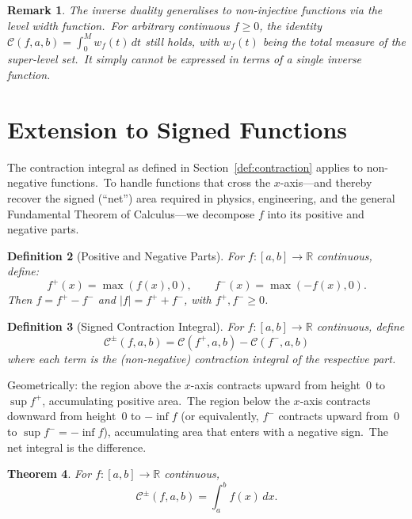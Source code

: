 \documentclass[11pt,a4paper]{article}
\newtheorem{theorem}{Theorem}[section]
\newtheorem{definition}[theorem]{Definition}
\newtheorem{remark}[theorem]{Remark}
\begin{document}
\begin{remark}\label{rem:non-injective-duality}
The inverse duality generalises to non-injective functions via the level width function.\ For arbitrary continuous $f\geq 0$, the identity $\mathcal{C}(f,a,b)=\int_0^M w_f(t)\,dt$ still holds, with $w_f(t)$ being the total measure of the super-level set.\ It simply cannot be expressed in terms of a single inverse function.
\end{remark}

\section{Extension to Signed Functions}

The contraction integral as defined in Section~\ref{def:contraction} applies to non-negative functions.\ To handle functions that cross the $x$-axis---and thereby recover the signed (``net'') area required in physics, engineering, and the general Fundamental Theorem of Calculus---we decompose $f$ into its positive and negative parts.

\begin{definition}[Positive and Negative Parts]\label{def:pos-neg}
For $f:[a,b]\to\mathbb{R}$ continuous, define:
\[
f^+(x) = \max(f(x),0), \qquad f^-(x) = \max(-f(x),0).
\]
Then $f = f^+ - f^-$ and $|f| = f^+ + f^-$, with $f^+,f^-\geq 0$.
\end{definition}

\begin{definition}[Signed Contraction Integral]\label{def:signed}
For $f:[a,b]\to\mathbb{R}$ continuous, define
\[
\mathcal{C}^{\pm}(f,a,b) = \mathcal{C}(f^+,a,b) - \mathcal{C}(f^-,a,b)
\]
where each term is the (non-negative) contraction integral of the respective part.
\end{definition}

Geometrically: the region above the $x$-axis contracts upward from height~$0$ to $\sup f^+$, accumulating positive area.\ The region below the $x$-axis contracts downward from height~$0$ to $-\inf f$ (or equivalently, $f^-$ contracts upward from~$0$ to $\sup f^- = -\inf f$), accumulating area that enters with a negative sign.\ The net integral is the difference.

\begin{theorem}\label{thm:signed}
For $f:[a,b]\to\mathbb{R}$ continuous,
\[
\mathcal{C}^{\pm}(f,a,b) = \int_a^b f(x)\,dx.
\]
\end{theorem}
\end{document}
